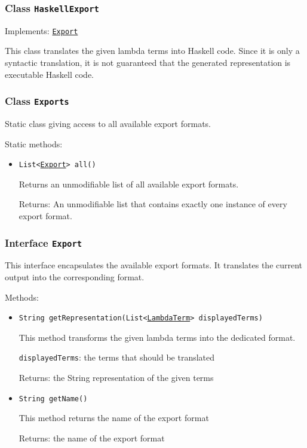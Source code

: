 \subsubsection{Class \texttt{HaskellExport}}
\label{type:edu.kit.wavelength.client.view.export.HaskellExport}
Implements: \texttt{\hyperref[type:edu.kit.wavelength.client.view.export.Export]{Export}}

This class translates the given lambda terms into Haskell code. Since it is
 only a syntactic translation, it is not guaranteed that the generated
 representation is executable Haskell code.

\subsubsection{Class \texttt{Exports}}
\label{type:edu.kit.wavelength.client.view.export.Exports}
Static class giving access to all available export formats.

Static methods:
\begin{itemize}
\item \texttt{List<\hyperref[type:edu.kit.wavelength.client.view.export.Export]{Export}> all()}

Returns an unmodifiable list of all available export formats.

Returns: An unmodifiable list that contains exactly one instance of every
         export format.

\end{itemize}

\subsubsection{Interface \texttt{Export}}
\label{type:edu.kit.wavelength.client.view.export.Export}
This interface encapsulates the available export formats. It translates the
 current output into the corresponding format.

Methods:
\begin{itemize}
\item \texttt{String getRepresentation(List<\hyperref[type:edu.kit.wavelength.client.model.term.LambdaTerm]{LambdaTerm}> displayedTerms)}

This method transforms the given lambda terms into the dedicated format.

\texttt{displayedTerms}: the terms that should be translated

Returns: the String representation of the given terms

\item \texttt{String getName()}

This method returns the name of the export format

Returns: the name of the export format

\end{itemize}

